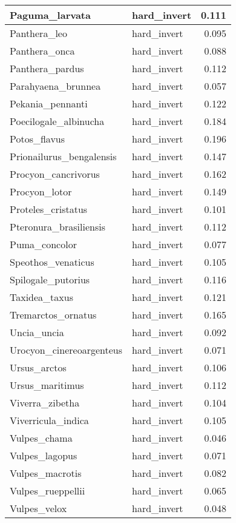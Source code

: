 \begin{table}
\begin{tabular}[t]{l|l|r}
\hline
Paguma\_larvata & hard\_invert & 0.111\\
\hline
Panthera\_leo & hard\_invert & 0.095\\
\hline
Panthera\_onca & hard\_invert & 0.088\\
\hline
Panthera\_pardus & hard\_invert & 0.112\\
\hline
Parahyaena\_brunnea & hard\_invert & 0.057\\
\hline
Pekania\_pennanti & hard\_invert & 0.122\\
\hline
Poecilogale\_albinucha & hard\_invert & 0.184\\
\hline
Potos\_flavus & hard\_invert & 0.196\\
\hline
Prionailurus\_bengalensis & hard\_invert & 0.147\\
\hline
Procyon\_cancrivorus & hard\_invert & 0.162\\
\hline
Procyon\_lotor & hard\_invert & 0.149\\
\hline
Proteles\_cristatus & hard\_invert & 0.101\\
\hline
Pteronura\_brasiliensis & hard\_invert & 0.112\\
\hline
Puma\_concolor & hard\_invert & 0.077\\
\hline
Speothos\_venaticus & hard\_invert & 0.105\\
\hline
Spilogale\_putorius & hard\_invert & 0.116\\
\hline
Taxidea\_taxus & hard\_invert & 0.121\\
\hline
Tremarctos\_ornatus & hard\_invert & 0.165\\
\hline
Uncia\_uncia & hard\_invert & 0.092\\
\hline
Urocyon\_cinereoargenteus & hard\_invert & 0.071\\
\hline
Ursus\_arctos & hard\_invert & 0.106\\
\hline
Ursus\_maritimus & hard\_invert & 0.112\\
\hline
Viverra\_zibetha & hard\_invert & 0.104\\
\hline
Viverricula\_indica & hard\_invert & 0.105\\
\hline
Vulpes\_chama & hard\_invert & 0.046\\
\hline
Vulpes\_lagopus & hard\_invert & 0.071\\
\hline
Vulpes\_macrotis & hard\_invert & 0.082\\
\hline
Vulpes\_rueppellii & hard\_invert & 0.065\\
\hline
Vulpes\_velox & hard\_invert & 0.048\\

\end{tabular}
\end{table}
